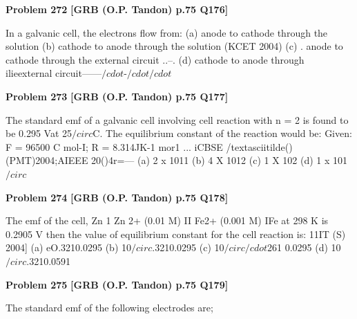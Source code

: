 \begin{problembox}
\textbf{Problem 272} \hfill \textbf{[GRB (O.P. Tandon) p.75 Q176]}
\label{q:ext-grb_all_questions-272}

In a galvanic cell, the electrons flow from: 
(a) anode to cathode through the solution 
(b) cathode to anode through the solution 
(KCET 2004) 
(c) . anode to cathode through the external circuit 
..\underline{\hspace{1cm}}--\underline{\hspace{1cm}}. 
(d) cathode to anode through ilieexternal circuit------$/cdot$-$/cdot$$/cdot$
\end{problembox}

\begin{problembox}
\textbf{Problem 273} \hfill \textbf{[GRB (O.P. Tandon) p.75 Q177]}
\label{q:ext-grb_all_questions-273}

The standard emf of a galvanic cell involving cell reaction 
with n = 2 is found to be 0.295 Vat 25$/circ$C. The equilibrium 
constant of the reaction would be: 
Given: F = 96500 C mol-I; R = 8.314JK-1 mor1 
... iCBSE /textasciitilde()(PMT)2004;AIEEE 20()4r=---
(a) 2 x 1011 
(b) 4 X 1012 
(c) 1 X 102 
(d) 1 x 101$/circ$
\end{problembox}

\begin{problembox}
\textbf{Problem 274} \hfill \textbf{[GRB (O.P. Tandon) p.75 Q178]}
\label{q:ext-grb_all_questions-274}

The emf of the cell, 
Zn 1 Zn 2+ (0.01 M) II Fe2+ (0.001 M) IFe 
at 298 K is 0.2905 V then the value of equilibrium constant for 
the cell reaction is: 
11IT (S) 2004] 
(a) eO.3210.0295 
(b) 10$/circ$.3210.0295 
(c) 10$/circ$$/cdot$261 0.0295 
(d) 10$/circ$.3210.0591
\end{problembox}

\begin{problembox}
\textbf{Problem 275} \hfill \textbf{[GRB (O.P. Tandon) p.75 Q179]}
\label{q:ext-grb_all_questions-275}

The standard emf of the following electrodes are;
\end{problembox}

